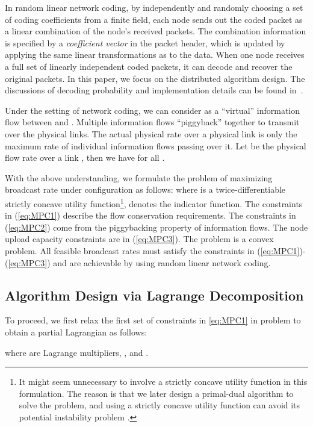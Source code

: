 \documentclass[10pt,conference]{IEEEtran}
\begin{document}
In random linear network coding, by independently and randomly choosing
a set of coding coefficients from a finite field, each node sends
out the coded packet as a linear combination of the
node's received packets. The combination information is
specified by a \emph{coefficient vector} in the packet header, which is
updated by applying the same linear transformations as to the data. When
one node receives a full set of linearly independent coded packets,
it can decode and recover the original packets. In this paper, we
focus on the distributed algorithm design. The discussions of
decoding probability and implementation details
can be found in~\cite{ho2009dynamic,chou2003practical}.

Under the setting of network coding, we can consider  as a {}``virtual''
information flow between  and . Multiple information flows
{}``piggyback'' together to transmit over the physical links. The
actual physical rate over a physical link is only the maximum rate
of individual information flows passing over it. Let  be the physical
flow rate over a link , then we have 
for all .

With the above understanding, we formulate the problem of maximizing
broadcast rate under configuration  as follows: 
 where  is a twice-differentiable strictly concave
utility function\footnote{It might seem unnecessary to involve a strictly concave utility
function in this formulation. The reason is that we later design a
primal-dual algorithm to solve the problem, and using a strictly concave
utility function can avoid its potential instability problem \cite{chen2008ump}.},  denotes the indicator function. The constraints
in (\ref{eq:MPC1}) describe the flow conservation requirements. The constraints in (\ref{eq:MPC2}) come from the piggybacking
property of information flows. The node upload capacity constraints
are in (\ref{eq:MPC3}). The problem  is a convex problem.
All feasible broadcast rates must satisfy the constraints in (\ref{eq:MPC1})-(\ref{eq:MPC3})
and are achievable by using random linear network coding.

\subsection{Algorithm Design via Lagrange Decomposition}

To proceed, we first relax the first set of constraints in \eqref{eq:MPC1}
in problem  to obtain a partial Lagrangian as follows:

 where  are Lagrange multipliers,
, and .
\end{document}
